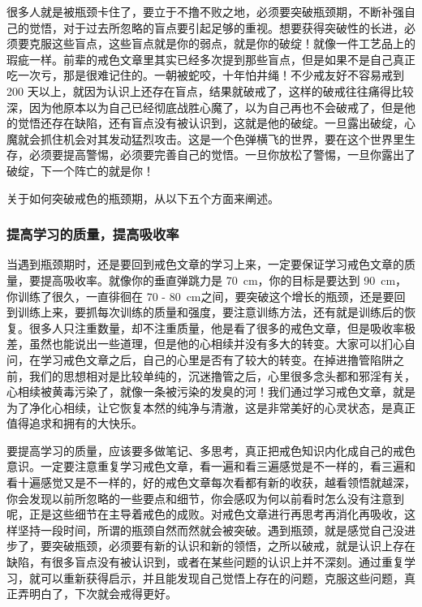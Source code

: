 很多人就是被瓶颈卡住了，要立于不撸不败之地，必须要突破瓶颈期，不断补强自己的觉悟，对于过去所忽略的盲点要引起足够的重视。想要获得突破性的长进，必须要克服这些盲点，这些盲点就是你的弱点，就是你的破绽！就像一件工艺品上的瑕疵一样。前辈的戒色文章里其实已经多次提到那些盲点，但是如果不是自己真正吃一次亏，那是很难记住的。一朝被蛇咬，十年怕井绳！不少戒友好不容易戒到 200 天以上，就因为认识上还存在盲点，结果就破戒了，这样的破戒往往痛得比较深，因为他原本以为自己已经彻底战胜心魔了，以为自己再也不会破戒了，但是他的觉悟还存在缺陷，还有盲点没有被认识到，这就是他的破绽。一旦露出破绽，心魔就会抓住机会对其发动猛烈攻击。这是一个色弹横飞的世界，要在这个世界里生存，必须要提高警惕，必须要完善自己的觉悟。一旦你放松了警惕，一旦你露出了破绽，下一个阵亡的就是你！

关于如何突破戒色的瓶颈期，从以下五个方面来阐述。

\subsubsection{提高学习的质量，提高吸收率}

当遇到瓶颈期时，还是要回到戒色文章的学习上来，一定要保证学习戒色文章的质量，要提高吸收率。就像你的垂直弹跳力是 \SI{70}{\centi\metre}，你的目标是要达到 \SI{90}{\centi\metre}，你训练了很久，一直徘徊在 70 - \SI{80}{\centi\metre}之间，要突破这个增长的瓶颈，还是要回到训练上来，要抓每次训练的质量和强度，要注意训练方法，还有就是训练后的恢复。很多人只注重数量，却不注重质量，他是看了很多的戒色文章，但是吸收率极差，虽然也能说出一些道理，但是他的心相续并没有多大的转变。大家可以扪心自问，在学习戒色文章之后，自己的心里是否有了较大的转变。在掉进撸管陷阱之前，我们的思想相对是比较单纯的，沉迷撸管之后，心里很多念头都和邪淫有关，心相续被黄毒污染了，就像一条被污染的发臭的河！我们通过学习戒色文章，就是为了净化心相续，让它恢复本然的纯净与清澈，这是非常美好的心灵状态，是真正值得追求和拥有的大快乐。

要提高学习的质量，应该要多做笔记、多思考，真正把戒色知识内化成自己的戒色意识。一定要注意重复学习戒色文章，看一遍和看三遍感觉是不一样的，看三遍和看十遍感觉又是不一样的，好的戒色文章每次看都有新的收获，越看领悟就越深，你会发现以前所忽略的一些要点和细节，你会感叹为何以前看时怎么没有注意到呢，正是这些细节在主导着戒色的成败。对戒色文章进行再思考再消化再吸收，这样坚持一段时间，所谓的瓶颈自然而然就会被突破。遇到瓶颈，就是感觉自己没进步了，要突破瓶颈，必须要有新的认识和新的领悟，之所以破戒，就是认识上存在缺陷，有很多盲点没有被认识到，或者在某些问题的认识上并不深刻。通过重复学习，就可以重新获得启示，并且能发现自己觉悟上存在的问题，克服这些问题，真正弄明白了，下次就会戒得更好。

